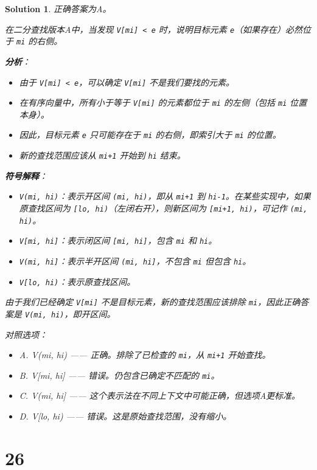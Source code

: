 \documentclass[UTF8]{report}
\newtheorem{solution}{Solution}
\theoremstyle{MyLineTheoremStyle} %
\theoremstyle{MyBlockTheoremStyle} %
\theoremstyle{MySubsubsectionStyle} %
\begin{document}
\begin{solution}
正确答案为A。

在二分查找版本A中，当发现 \texttt{V[mi] < e} 时，说明目标元素 \texttt{e}（如果存在）必然位于 \texttt{mi} 的右侧。

\textbf{分析}：
\begin{itemize}
    \item 由于 \texttt{V[mi] < e}，可以确定 \texttt{V[mi]} 不是我们要找的元素。
    \item 在有序向量中，所有小于等于 \texttt{V[mi]} 的元素都位于 \texttt{mi} 的左侧（包括 \texttt{mi} 位置本身）。
    \item 因此，目标元素 \texttt{e} 只可能存在于 \texttt{mi} 的右侧，即索引大于 \texttt{mi} 的位置。
    \item 新的查找范围应该从 \texttt{mi+1} 开始到 \texttt{hi} 结束。
\end{itemize}

\textbf{符号解释}：
\begin{itemize}
    \item \texttt{V(mi, hi)}：表示开区间 \texttt{(mi, hi)}，即从 \texttt{mi+1} 到 \texttt{hi-1}。在某些实现中，如果原查找区间为 \texttt{[lo, hi)}（左闭右开），则新区间为 \texttt{[mi+1, hi)}，可记作 \texttt{(mi, hi)}。
    \item \texttt{V[mi, hi]}：表示闭区间 \texttt{[mi, hi]}，包含 \texttt{mi} 和 \texttt{hi}。
    \item \texttt{V(mi, hi]}：表示半开区间 \texttt{(mi, hi]}，不包含 \texttt{mi} 但包含 \texttt{hi}。
    \item \texttt{V[lo, hi)}：表示原查找区间。
\end{itemize}

由于我们已经确定 \texttt{V[mi]} 不是目标元素，新的查找范围应该排除 \texttt{mi}，因此正确答案是 \texttt{V(mi, hi)}，即开区间。

对照选项：
\begin{itemize}
    \item A. V(mi, hi) —— 正确。排除了已检查的 \texttt{mi}，从 \texttt{mi+1} 开始查找。
    \item B. V[mi, hi] —— 错误。仍包含已确定不匹配的 \texttt{mi}。
    \item C. V(mi, hi] —— 这个表示法在不同上下文中可能正确，但选项A更标准。
    \item D. V[lo, hi) —— 错误。这是原始查找范围，没有缩小。
\end{itemize}
\end{solution}


\section*{26}
\end{document}
